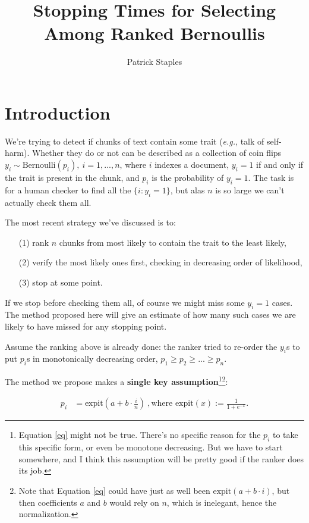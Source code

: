 \documentclass{article}
\title{Stopping Times for Selecting\\Among Ranked Bernoullis}
\date{}
\author{Patrick Staples}
\begin{document}
\maketitle

\section{Introduction}

We're trying to detect if chunks of text contain some trait (\textit{e.g.}, talk of self-harm). Whether they do or not can be described as a collection of coin flips $y_i \sim \text{Bernoulli}(p_i),\ i=1,...,n$, where $i$ indexes a document, $y_i=1$ if and only if the trait is present in the chunk, and $p_i$ is the probability of $y_i=1$. The task is for a human checker to find all the $\{i: y_i=1\}$, but alas $n$ is so large we can't actually check them all.

The most recent strategy we've discussed is to:
\begin{enumerate}
\item[(1)] rank $n$ chunks from most likely to contain the trait to the least likely,
\item[(2)] verify the most likely ones first, checking in decreasing order of likelihood,
\item[(3)] stop at some point.
\end{enumerate}

If we stop before checking them all, of course we might miss some $y_i=1$ cases. The method proposed here will give an estimate of how many such cases we are likely to have missed for any stopping point.

Assume the ranking above is already done: the ranker tried to re-order the $y_i$s to put $p_i$s in monotonically decreasing order, $p_1 \geq p_2 \geq ... \geq p_n$.

The method we propose makes a \textbf{single key assumption}\footnote{Equation \ref{eq} might not be true. There's no specific reason for the $p_i$ to take this specific form, or even be monotone decreasing. But we have to start somewhere, and I think this assumption will be pretty good if the ranker does its job.}\footnote{Note that Equation \ref{eq} could have just as well been $\text{expit}(a+b\cdot i)$, but then coefficients $a$ and $b$ would rely on $n$, which is inelegant, hence the normalization.}:

\begin{align}
p_i &= \boxed{\text{expit}\left(a + b\cdot \frac{i}{n}\right)}\ ,\text{where expit}(x) := \frac{1}{1+e^{-x}}.\label{eq}
\end{align}
\end{document}
